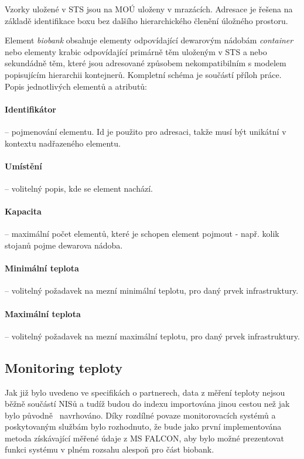Vzorky uložené v STS jsou na MOÚ uloženy v mrazácích. Adresace je řešena na základě identifikace boxu bez dalšího hierarchického členění úložného prostoru.

Element \textit{biobank} obsahuje elementy odpovídající dewarovým nádobám \textit{container} nebo elementy  krabic odpovídající primárně těm uloženým v STS a nebo sekundádně těm, které jsou adresované způsobem nekompatibilním s modelem popisujícím hierarchii kontejnerů. 
Kompletní schéma je součástí příloh práce. Popis jednotlivých elementů a atributů:
\paragraph*{Identifikátor} -- pojmenování elementu. Id je použito pro adresaci, takže musí být unikátní v kontextu nadřazeného elementu.
\paragraph*{Umístění} -- volitelný popis, kde se element nachází.
\paragraph*{Kapacita} -- maximální počet elementů, které je schopen element pojmout - např. kolik stojanů pojme dewarova nádoba.
\paragraph*{Minimální teplota} -- volitelný požadavek na mezní minimální teplotu, pro daný prvek infrastruktury.
\paragraph*{Maximální teplota} -- volitelný požadavek na mezní maximální teplotu, pro daný prvek infrastruktury.

\subsection{Monitoring teploty}
Jak již bylo uvedeno ve specifikách o partnerech, data z měření teploty nejsou běžně součástí NISů a tudíž budou do indexu importována jinou cestou než jak bylo původně~\cite{ARCH_2011_12_29} navrhováno. Díky rozdílné povaze monitorovacích systémů a poskytovaným službám bylo rozhodnuto, že bude jako první implementována metoda získávající měřené údaje z MS FALCON, aby bylo možné prezentovat funkci systému v plném rozsahu alespoň pro část biobank.

